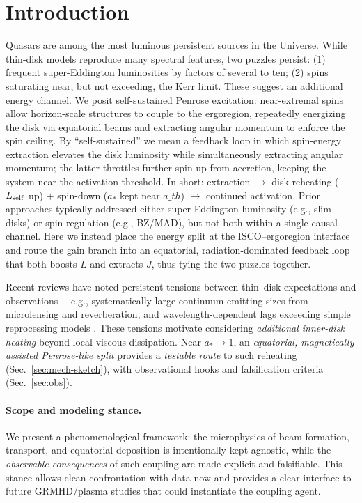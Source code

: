 \documentclass[twocolumn]{aastex701}
\newcommand{\ath}{a_{\rm th}}
\newcommand{\rg}{r_g}
\newcommand{\LEdd}{L_{\rm Edd}}
\newcommand{\Ltot}{L_{\rm tot}}
\newcommand{\FeKa}{\mathrm{Fe\,K}\alpha}
\def\ath{a\_th}\def\rg{r\_g}\def\LEdd{L\_Edd}\def\Ltot{L\_tot}\def\FeKa{Fe K\string\alpha}%
\begin{document}
\section{Introduction}\label{sec:intro}
Quasars are among the most luminous persistent sources in the Universe. While thin-disk models reproduce many spectral features, two puzzles persist: (1) frequent super-Eddington luminosities by factors of several to ten; (2) spins saturating near, but not exceeding, the Kerr limit. These suggest an additional energy channel. We posit self-sustained Penrose excitation: near-extremal spins allow horizon-scale structures to couple to the ergoregion, repeatedly energizing the disk via equatorial beams and extracting angular momentum to enforce the spin ceiling.
By ``self-sustained'' we mean a feedback loop in which spin-energy extraction elevates the disk luminosity while simultaneously extracting angular momentum; the latter throttles further spin-up from accretion, keeping the system near the activation threshold. In short: extraction $\rightarrow$ disk reheating ($L_{\rm self}$ up) $+$ spin-down ($a_\ast$ kept near $\ath$) $\rightarrow$ continued activation.
Prior approaches typically addressed either super-Eddington luminosity (e.g., slim disks) or spin regulation (e.g., BZ/MAD), but not both within a single causal channel. Here we instead place the energy split at the ISCO–ergoregion interface and route the gain branch into an equatorial, radiation-dominated feedback loop that both boosts $L$ and extracts $J$, thus tying the two puzzles together.

Recent reviews have noted persistent tensions between thin–disk expectations and observations—
e.g., systematically large continuum-emitting sizes from microlensing and reverberation, and
wavelength-dependent lags exceeding simple reprocessing models \citep[e.g.,][]{Cackett2021RevMap,Sun2020AGNsize}.
These tensions motivate considering \emph{additional inner-disk heating} beyond local viscous dissipation.
Near $a_*\!\to\!1$, an \emph{equatorial, magnetically assisted Penrose-like split} provides a \emph{testable route}
to such reheating (Sec.~\ref{sec:mech-sketch}), with observational hooks and falsification criteria
(Sec.~\ref{sec:obs}).


\paragraph{Scope and modeling stance.}
We present a phenomenological framework: the microphysics of beam formation, transport, and equatorial deposition is intentionally kept agnostic, while the \emph{observable consequences} of such coupling are made explicit and falsifiable. This stance allows clean confrontation with data now and provides a clear interface to future GRMHD/plasma studies that could instantiate the coupling agent.
\end{document}
